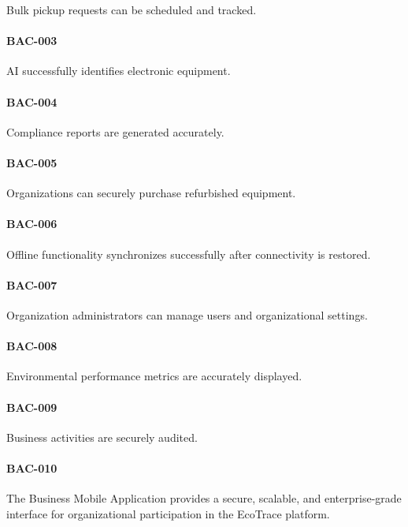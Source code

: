 Bulk pickup requests can be scheduled and tracked.

\paragraph{BAC-003}

AI successfully identifies electronic equipment.

\paragraph{BAC-004}

Compliance reports are generated accurately.

\paragraph{BAC-005}

Organizations can securely purchase refurbished equipment.

\paragraph{BAC-006}

Offline functionality synchronizes successfully after connectivity is
restored.

\paragraph{BAC-007}

Organization administrators can manage users and organizational
settings.

\paragraph{BAC-008}

Environmental performance metrics are accurately displayed.

\paragraph{BAC-009}

Business activities are securely audited.

\paragraph{BAC-010}

The Business Mobile Application provides a secure, scalable, and
enterprise-grade interface for organizational participation in the
EcoTrace platform.

